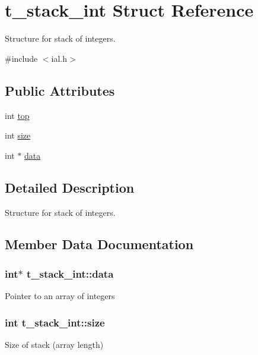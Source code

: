 \hypertarget{structt__stack__int}{}\section{t\+\_\+stack\+\_\+int Struct Reference}
\label{structt__stack__int}


Structure for stack of integers.  




{\ttfamily \#include $<$ial.\+h$>$}

\subsection*{Public Attributes}
\begin{DoxyCompactItemize}
\item 
int \hyperlink{structt__stack__int_abedfedc1347b081f09c7d7ce85e12ab4}{top}
\item 
int \hyperlink{structt__stack__int_a4e90bf78700d2e48f141b35ae27127f6}{size}
\item 
int $\ast$ \hyperlink{structt__stack__int_ac2d90194c10e635edf21dcccfddc8c9c}{data}
\end{DoxyCompactItemize}


\subsection{Detailed Description}
Structure for stack of integers. 

\subsection{Member Data Documentation}
\hypertarget{structt__stack__int_ac2d90194c10e635edf21dcccfddc8c9c}{}
\subsubsection[{data}]{\setlength{\rightskip}{0pt plus 5cm}int$\ast$ t\+\_\+stack\+\_\+int\+::data}\label{structt__stack__int_ac2d90194c10e635edf21dcccfddc8c9c}
Pointer to an array of integers \hypertarget{structt__stack__int_a4e90bf78700d2e48f141b35ae27127f6}{}
\subsubsection[{size}]{\setlength{\rightskip}{0pt plus 5cm}int t\+\_\+stack\+\_\+int\+::size}\label{structt__stack__int_a4e90bf78700d2e48f141b35ae27127f6}
Size of stack (array length) \hypertarget{structt__stack__int_abedfedc1347b081f09c7d7ce85e12ab4}{}
